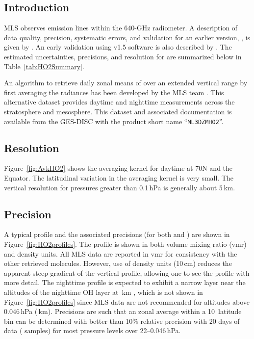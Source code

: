 
\subsection{Introduction}
MLS observes  emission lines within the 640-GHz radiometer. A description of  data quality, precision, systematic errors, and validation for an earlier version, \vii, is given by \citet{PickettEtal:2006:Validation}. An early validation using v1.5 software is also described by \citet{PickettEtal:2006:Validation}. The estimated uncertainties, precisions, and resolution for \thisv {} are summarized below in Table~\ref{tab:HO2Summary}.  

An algorithm to retrieve daily zonal means of  over an extended vertical range by first averaging the radiances has been developed by the MLS team \citep{MillanEtal:2015}. This alternative dataset provides daytime and nighttime  measurements across the stratosphere and mesosphere. This dataset and associated documentation is available from the GES-DISC with the product short name ``\texttt{ML3DZMHO2}''.

\subsection{Resolution}

Figure~\ref{fig:AvkHO2} shows the  averaging kernel for daytime at 70\degsym N and the Equator. The latitudinal variation in the averaging kernel is very small. The vertical resolution for pressures greater than 0.1\,hPa is generally about 5\,km.

\subsection{Precision}

A typical  profile and the associated precisions (for both \prevv and \thisv) are shown in Figure~\ref{fig:HO2profiles}. The profile is shown in both volume mixing ratio (vmr) and density units. All MLS data are reported in vmr for consistency with the other retrieved molecules. However, use of density units (10\,cm) reduces the apparent steep gradient of the  vertical profile, allowing one to see the profile with more detail. The nighttime  profile is expected to exhibit a narrow layer near the altitudes of the nighttime OH layer at \,km \citep{PickettEtal:2006:NightOH}, which is not shown in Figure~\ref{fig:HO2profiles} since MLS  data are not recommended for altitudes above 0.046\,hPa (\,km). Precisions are such that an  zonal average within a 10\degsym\ latitude bin can be determined with better than 10\% relative precision with 20 days of data ( samples) for most pressure levels over 22--0.046\,hPa.

